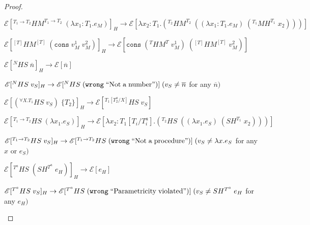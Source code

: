 \begin{theorem}
\begin{proof}
\begin{case}
\end{case}
\begin{case}
$\mathscr{E}[^{T_{1}\rightarrow T_{2}}HM^{T_{1}\rightarrow T_{2}}\;(\lambda x_{1}:T_{1}.e_{M})]_{H}\rightarrow\mathscr{E}[\lambda x_{2}:T_{1}.(^{T_{2}}HM^{T_{2}}\;((\lambda x_{1}:T_{1}.e_{M})\;(^{T_{1}}MH^{T_{1}}\;x_{2})))]$

\end{case}
\begin{case}
$\mathscr{E}[^{[T]}HM^{[T]}\;(\mathtt{cons}\;v_{M}^{1}\;v_{M}^{2})]_{H}\rightarrow\mathscr{E}[\mathtt{cons}\;(^{T}HM^{T}\;v_{M}^{1})\;(^{[T]}HM^{[T]}\;v_{M}^{2})]$

\end{case}
\begin{case}
$\mathscr{E}[^{N}HS\;\overline{n}]_{H}\rightarrow\mathscr{E}[\overline{n}]$

\end{case}
\begin{case}
$\mathscr{E}[^{N}HS\;v_{S}]_{H}\rightarrow\mathscr{E}[^{N}HS\;(\mathtt{wrong}\;\mathrm{``Not\;a\;number"})]\;(v_{S}\neq\overline{n}$ for any $\overline{n})$

\end{case}
\begin{case}
$\mathscr{E}[(^{\forall X.T_{1}}HS\;v_{S})\;\lbrace T_{2}\rbrace]_{H}\rightarrow\mathscr{E}[^{T_{1}[T^{a}_{2}/X]}HS\;v_{S}]$

\end{case}
\begin{case}
$\mathscr{E}[^{T_{1}\rightarrow T_{2}}HS\;(\lambda x_{1}.e_{S})]_{H}\rightarrow\mathscr{E}[\lambda x_{2}:T_{1}[T_{i}/T^{a}_{i}].(^{T_{2}}HS\;((\lambda x_{1}.e_{S})\;(SH^{T_{1}}\;x_{2})))]$

\end{case}
\begin{case}
$\mathscr{E}[^{T_{1}\rightarrow T_{2}}HS\;v_{S}]_{H}\rightarrow\mathscr{E}[^{T_{1}\rightarrow T_{2}}HS\;(\mathtt{wrong}\;\mathrm{``Not\;a\;procedure"})]\;(v_{S}\neq\lambda x.e_{S}$ for any $x$ or $e_{S})$

\end{case}
\begin{case}
$\mathscr{E}[^{T^{a}}HS\;(SH^{T^{a}}\;e_{H})]_{H}\rightarrow\mathscr{E}[e_{H}]$

\end{case}
\begin{case}
$\mathscr{E}[^{T^{a}}HS\;v_{S}]_{H}\rightarrow\mathscr{E}[^{T^{a}}HS\;(\mathtt{wrong}\;\mathrm{``Parametricity\;violated"})]\;(v_{S}\neq SH^{T^{a}}\;e_{H}$ for any $e_{H})$


\end{case}
\end{proof}
\end{theorem}
